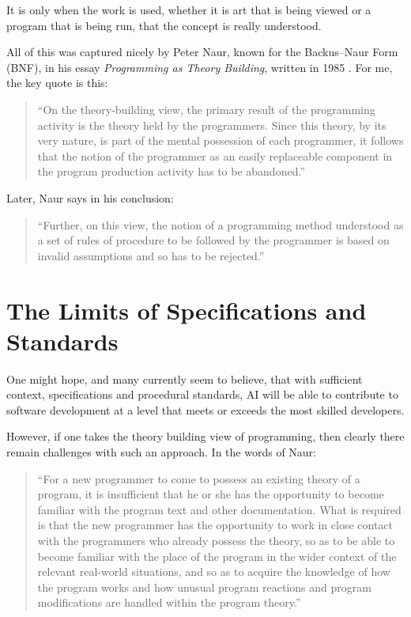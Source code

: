 \documentclass[12pt]{extarticle}
\begin{document}
It is only when the work is used, whether it is art that is
being viewed or a program that is being run, that the concept is
really understood.

All of this was captured nicely by Peter Naur, known for the
Backus--Naur Form (BNF), in his essay \emph{Programming as Theory
  Building}, written in 1985 \cite{naur1985}. For me, the key quote
is this:
\begin{quote}
  ``On the theory-building view, the primary result of the programming
  activity is the theory held by the programmers. Since this theory,
  by its very nature, is part of the mental possession of each
  programmer, it follows that the notion of the programmer as an
  easily replaceable component in the program production activity has
  to be abandoned.''
\end{quote}

Later, Naur says in
his conclusion:
\begin{quote}
  ``Further, on this view, the notion of a programming method
  understood as a set of rules of procedure to be followed by the
  programmer is based on invalid assumptions and so has to be
  rejected.''
\end{quote}

\section{The Limits of Specifications and Standards}
One might hope, and many currently seem to believe, that with sufficient context, specifications and procedural standards, AI will be able to contribute to
software development at a level that meets or exceeds the most skilled developers.

However, if one takes the theory building view of programming, then clearly there remain challenges with such an approach. In the words of Naur:

\begin{quote}
  ``For a new programmer to come to possess an existing theory of a
  program, it is insufficient that he or she has the opportunity to
  become familiar with the program text and other documentation. What
  is required is that the new programmer has the opportunity to work
  in close contact with the programmers who already possess the
  theory, so as to be able to become familiar with the place of the
  program in the wider context of the relevant real-world situations,
  and so as to acquire the knowledge of how the program works and how
  unusual program reactions and program modifications are handled
  within the program theory.''
\end{quote}
\end{document}
